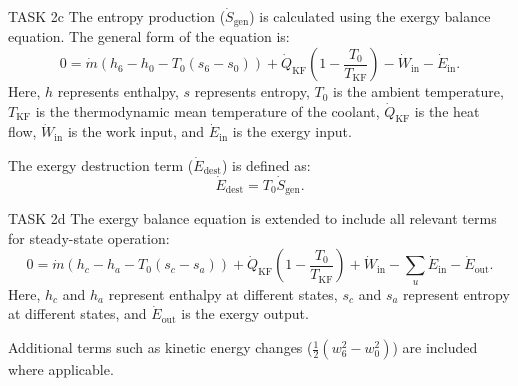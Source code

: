 TASK 2c  
The entropy production (\( \dot{S}_{\text{gen}} \)) is calculated using the exergy balance equation. The general form of the equation is:  
\[
0 = \dot{m} \left( h_6 - h_0 - T_0 (s_6 - s_0) \right) + \dot{Q}_{\text{KF}} \left( 1 - \frac{T_0}{T_{\text{KF}}} \right) - \dot{W}_{\text{in}} - \dot{E}_{\text{in}}.
\]  
Here, \( h \) represents enthalpy, \( s \) represents entropy, \( T_0 \) is the ambient temperature, \( T_{\text{KF}} \) is the thermodynamic mean temperature of the coolant, \( \dot{Q}_{\text{KF}} \) is the heat flow, \( \dot{W}_{\text{in}} \) is the work input, and \( \dot{E}_{\text{in}} \) is the exergy input.  

The exergy destruction term (\( \dot{E}_{\text{dest}} \)) is defined as:  
\[
\dot{E}_{\text{dest}} = T_0 \dot{S}_{\text{gen}}.
\]  

TASK 2d  
The exergy balance equation is extended to include all relevant terms for steady-state operation:  
\[
0 = \dot{m} \left( h_c - h_a - T_0 (s_c - s_a) \right) + \dot{Q}_{\text{KF}} \left( 1 - \frac{T_0}{T_{\text{KF}}} \right) + \dot{W}_{\text{in}} - \sum_{u} \dot{E}_{\text{in}} - \dot{E}_{\text{out}}.
\]  
Here, \( h_c \) and \( h_a \) represent enthalpy at different states, \( s_c \) and \( s_a \) represent entropy at different states, and \( \dot{E}_{\text{out}} \) is the exergy output.  

Additional terms such as kinetic energy changes (\( \frac{1}{2} (w_6^2 - w_0^2) \)) are included where applicable.